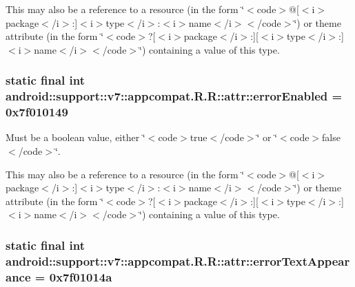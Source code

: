 This may also be a reference to a resource (in the form \char`\"{}$<$code$>$@\mbox{[}$<$i$>$package$<$/i$>$:\mbox{]}$<$i$>$type$<$/i$>$:$<$i$>$name$<$/i$>$$<$/code$>$\char`\"{}) or theme attribute (in the form \char`\"{}$<$code$>$?\mbox{[}$<$i$>$package$<$/i$>$:\mbox{]}\mbox{[}$<$i$>$type$<$/i$>$:\mbox{]}$<$i$>$name$<$/i$>$$<$/code$>$\char`\"{}) containing a value of this type. \hypertarget{classandroid_1_1support_1_1v7_1_1appcompat_1_1_r_1_1attr_df5e1b0166e3be1a0526c2042068804a}{
\subsubsection[{errorEnabled}]{\setlength{\rightskip}{0pt plus 5cm}static final int android::support::v7::appcompat.R.R::attr::errorEnabled = 0x7f010149}}
\label{classandroid_1_1support_1_1v7_1_1appcompat_1_1_r_1_1attr_df5e1b0166e3be1a0526c2042068804a}


Must be a boolean value, either \char`\"{}$<$code$>$true$<$/code$>$\char`\"{} or \char`\"{}$<$code$>$false$<$/code$>$\char`\"{}. 

This may also be a reference to a resource (in the form \char`\"{}$<$code$>$@\mbox{[}$<$i$>$package$<$/i$>$:\mbox{]}$<$i$>$type$<$/i$>$:$<$i$>$name$<$/i$>$$<$/code$>$\char`\"{}) or theme attribute (in the form \char`\"{}$<$code$>$?\mbox{[}$<$i$>$package$<$/i$>$:\mbox{]}\mbox{[}$<$i$>$type$<$/i$>$:\mbox{]}$<$i$>$name$<$/i$>$$<$/code$>$\char`\"{}) containing a value of this type. \hypertarget{classandroid_1_1support_1_1v7_1_1appcompat_1_1_r_1_1attr_73d883123a3a14a28f6848cacee63fb3}{
\subsubsection[{errorTextAppearance}]{\setlength{\rightskip}{0pt plus 5cm}static final int android::support::v7::appcompat.R.R::attr::errorTextAppearance = 0x7f01014a}}
\label{classandroid_1_1support_1_1v7_1_1appcompat_1_1_r_1_1attr_73d883123a3a14a28f6848cacee63fb3}


